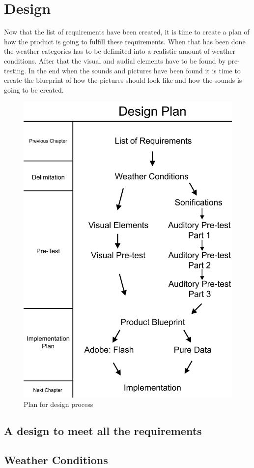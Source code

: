 
\section{Design} %
\label{sec:design}

Now that the list of requirements have been created, it is time to create a plan of how the product is going to fulfill these requirements. 
When that has been done the weather categories has to be delimited into a realistic amount of weather conditions. 
After that the visual and audial elements have to be found by pre-testing. 
In the end when the sounds and pictures have been found it is time to create the blueprint of how the pictures should look like and how the sounds is going to be created.

\begin{figure}[!htbp]
    \centering
    \includegraphics[width=.5\textwidth]{images/Design1.jpg}
    \caption{Plan for design process}
    \label{fig:design1}
\end{figure}


\subsection*{A design to meet all the requirements} %
\label{sub:a_design_to_meet_all_the_requirements}





\subsection*{Weather Conditions} %
\label{sub:weather_conditions}


